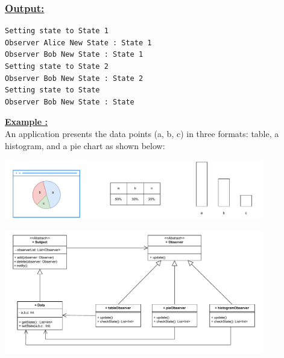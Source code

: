 \vspace{1cm}


\newpage


\vspace{1cm}



\subsubsection*{\underline{Output:}}
\begin{lstlisting}[style=cmd]
Setting state to State 1
Observer Alice New State : State 1
Observer Bob New State : State 1
Setting state to State 2
Observer Bob New State : State 2
Setting state to State
Observer Bob New State : State
\end{lstlisting}

\newpage

\textbf{\underline{Example :}}\\[0.15cm]
An application presents the data points (a, b, c) in three formats: table, a histogram, and a pie chart as shown below:

\begin{center}
\includegraphics[width=0.85\textwidth]{Chapters/DesignPattern/Observer/ex1.drawio.pdf}
\end{center}

\vspace{0.5cm}

\begin{center}
\includegraphics[width=0.85\textwidth]{Chapters/DesignPattern/Observer/obs.drawio.pdf}
\end{center}

